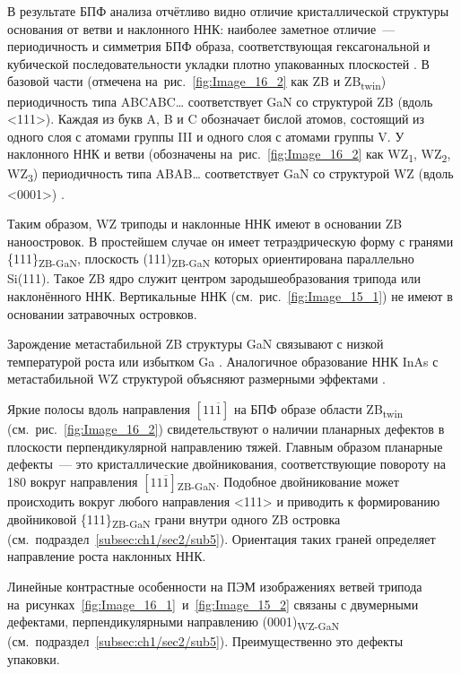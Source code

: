 В результате БПФ анализа отчётливо видно отличие кристаллической структуры
основания от ветви и наклонного ННК: наиболее заметное отличие~---
периодичность и симметрия БПФ образа, соответствующая гексагональной и
кубической последовательности укладки плотно упакованных плоскостей
\cite{Jo2018, Bayram2014, Borysiuk2014}. В базовой части (отмечена
на~рис.~\cref{fig:Image_16_2} как ZB и ZB\textsubscript{twin}) периодичность
типа ABCABC{\dots} соответствует GaN со структурой ZB (вдоль <111>). Каждая из
букв A, B и C обозначает бислой атомов, состоящий из одного слоя с атомами
группы III и одного слоя с атомами группы V. У наклонного ННК и ветви
(обозначены на~рис.~\cref{fig:Image_16_2} как WZ\textsubscript{1},
WZ\textsubscript{2}, WZ\textsubscript{3}) периодичность типа ABAB{\dots}
соответствует GaN со структурой WZ (вдоль <0001>) \cite{Kriegner2011}.

Таким образом, WZ триподы и наклонные ННК имеют в основании ZB наноостровок. В
простейшем случае он имеет тетраэдрическую форму с гранями
\{111\}\textsubscript{ZB-GaN}, плоскость (111)\textsubscript{ZB-GaN} которых
ориентирована параллельно Si(111). Такое ZB ядро служит центром
зародышеобразования трипода или наклонённого ННК. Вертикальные ННК
(см.~рис.~\cref{fig:Image_15_1}) не имеют в основании затравочных островков.

Зарождение метастабильной ZB структуры GaN связывают с низкой температурой
роста или избытком Ga \cite{Shi2006, Romano1997}. Аналогичное образование ННК
InAs с метастабильной WZ структурой объясняют размерными эффектами
\cite{Johansson2010}.

Яркие полосы вдоль направления \([11\overline{1}]\) на БПФ образе области
ZB\textsubscript{twin} (см.~рис.~\cref{fig:Image_16_2}) свидетельствуют о
наличии планарных дефектов в плоскости перпендикулярной направлению тяжей.
Главным образом планарные дефекты~--- это кристаллические двойникования,
соответствующие повороту на 180{\textdegree} вокруг направления
\([11\overline{1}]\)\textsubscript{ZB-GaN}. Подобное двойникование может
происходить вокруг любого направления <111> \cite{Suturin2017} и приводить к
формированию двойниковой \{111\}\textsubscript{ZB-GaN} грани внутри одного ZB
островка (см.~подраздел~\cref{subsec:ch1/sec2/sub5}). Ориентация таких граней
определяет направление роста наклонных ННК.

Линейные контрастные особенности на ПЭМ изображениях ветвей трипода
на~рисунках~\cref{fig:Image_16_1}~и~\cref{fig:Image_15_2} связаны с двумерными
дефектами, перпендикулярными направлению (0001)\textsubscript{WZ-GaN}
(см.~подраздел~\cref{subsec:ch1/sec2/sub5}). Преимущественно это дефекты
упаковки.

